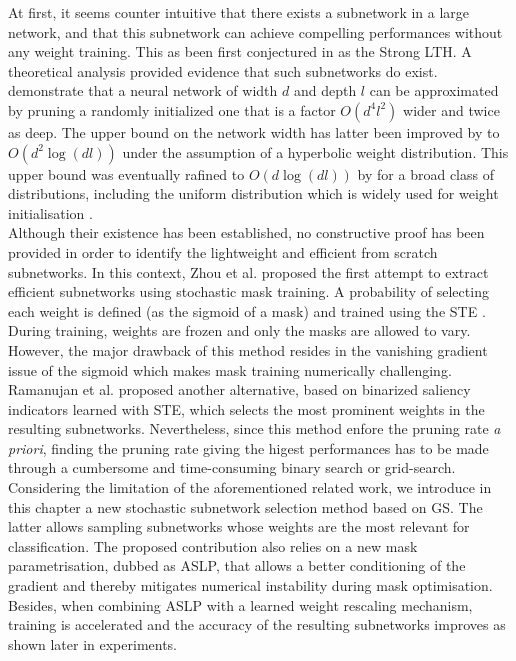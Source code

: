 At first, it seems counter intuitive that there exists a subnetwork in a large
network, and that this subnetwork can achieve compelling performances without
any weight training. This as been first conjectured in
\cite{DBLP:conf/cvpr/RamanujanWKFR20} as the Strong \ac{LTH}. A theoretical
analysis provided evidence that such subnetworks do exist.
\cite{DBLP:conf/icml/MalachYSS20} demonstrate that a neural network of width $d$
and depth $l$ can be approximated by pruning a randomly initialized one that is
a factor $O(d^4l^2)$ wider and twice as deep. The  upper bound on the network
width has latter been improved by \cite{DBLP:conf/nips/OrseauHR20} to
$O(d^2\log(dl))$ under the assumption of a hyperbolic weight distribution. This
upper bound was eventually rafined to $O(d\log(dl))$ by
\cite{DBLP:conf/nips/PensiaRNVP20} for a broad class of distributions, including
the uniform distribution which is widely used for weight initialisation \cite{DBLP:conf/iccv/HeZRS15}.\\

Although their existence has been established, no constructive proof has been
provided in order to identify the lightweight and efficient from scratch
subnetworks. In this context, Zhou et al. \cite{DBLP:conf/nips/ZhouLLY19}
proposed the first attempt to extract efficient subnetworks using stochastic
mask training. A probability of selecting each weight is defined (as the sigmoid
of a mask) and trained using the \ac{STE} \cite{DBLP:journals/corr/BengioLC13}.
During training, weights are frozen and only the masks are allowed to vary.
However, the major drawback of this method resides in the vanishing gradient
issue of the sigmoid which makes mask training numerically challenging.
Ramanujan et al. \cite{DBLP:conf/cvpr/RamanujanWKFR20} proposed another
alternative, based on binarized saliency indicators learned with \ac{STE}, which
selects the most prominent weights in the resulting subnetworks. Nevertheless,
since this method enfore the pruning rate \textit{a priori}, finding the pruning
rate giving the higest performances has to be made through a cumbersome and
time-consuming binary search or grid-search. \\ 

Considering the limitation of the aforementioned related  work, we introduce in
this chapter a new stochastic subnetwork selection method based on \ac{GS}.
The latter allows sampling subnetworks whose weights are the most relevant for
classification. The proposed contribution also relies on a new mask
parametrisation, dubbed as \ac{ASLP}, that allows a better conditioning of the
gradient and thereby mitigates numerical instability during mask optimisation.
Besides, when combining \ac{ASLP} with a learned weight rescaling mechanism,
training is accelerated and the accuracy of the resulting subnetworks improves
as shown later in experiments.

